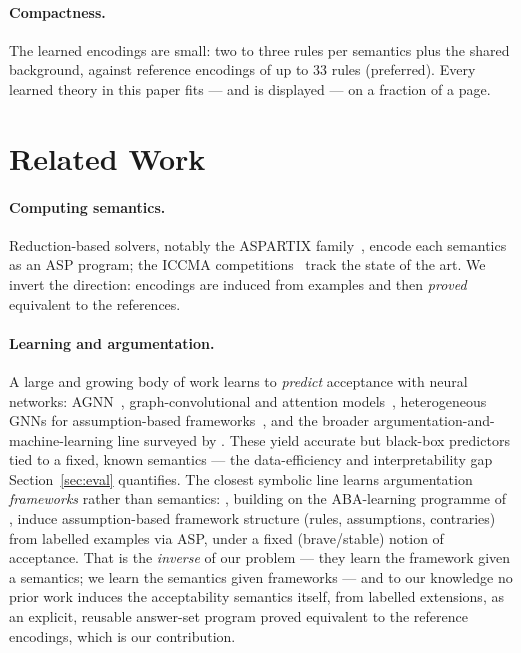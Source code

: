 \documentclass[review,12pt]{elsarticle}
\theoremstyle{definition}
\theoremstyle{remark}
\begin{document}
\paragraph{Compactness.} The learned encodings are small: two to three rules
per semantics plus the shared background, against reference encodings of up to
$33$ rules (preferred). Every learned theory in this paper fits --- and is
displayed --- on a fraction of a page.

\section{Related Work}
\label{sec:related}

\paragraph{Computing semantics.} Reduction-based solvers, notably the ASPARTIX
family~\citep{egly2010}, encode each semantics as an ASP program; the ICCMA
competitions~\citep{iccma23} track the state of the art. We invert the
direction: encodings are induced from examples and then \emph{proved}
equivalent to the references.

\paragraph{Learning and argumentation.} A large and growing body of work learns
to \emph{predict} acceptance with neural networks: AGNN~\citep{craandijkbex2020},
graph-convolutional and attention models~\citep{kuhlmann2019,cibier2024gnn},
heterogeneous GNNs for assumption-based frameworks~\citep{gehlot2025hetgnn}, and
the broader argumentation-and-machine-learning line surveyed by
\citet{rago2024argml}. These yield accurate but black-box predictors tied to a
fixed, known semantics --- the data-efficiency and interpretability gap
Section~\ref{sec:eval} quantifies. The closest symbolic line learns argumentation
\emph{frameworks} rather than semantics: \citet{deangelis2024aba}, building on the
ABA-learning programme of \citet{proietti2024aba}, induce assumption-based
framework structure (rules, assumptions, contraries) from labelled examples via
ASP, under a fixed (brave/stable) notion of acceptance. That is the
\emph{inverse} of our problem --- they learn the framework given a semantics; we
learn the semantics given frameworks --- and to our knowledge no prior work
induces the acceptability semantics itself, from labelled extensions, as an
explicit, reusable answer-set program proved equivalent to the reference
encodings, which is our contribution.
\end{document}
